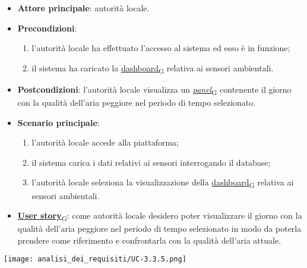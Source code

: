 \begin{itemize}
	\item \textbf{Attore principale}: autorità locale.
	\item \textbf{Precondizioni}:
	      \begin{enumerate}
		      \item l'autorità locale ha effettuato l'accesso al sistema ed esso è in funzione;
		      \item il sistema ha caricato la \href{https://7last.github.io/docs/pb/documentazione-interna/glossario\#dashboard}{dashboard\textsubscript{G}} relativa ai sensori ambientali.
	      \end{enumerate}
	\item \textbf{Postcondizioni}: l'autorità locale visualizza un \href{https://7last.github.io/docs/pb/documentazione-interna/glossario\#panel}{\textit{panel}\textsubscript{G}} contenente il giorno con la qualità dell'aria peggiore nel periodo di tempo selezionato.
	\item \textbf{Scenario principale}:
	      \begin{enumerate}
		      \item l'autorità locale accede alla piattaforma;
		      \item il sistema carica i dati relativi ai sensori interrogando il database;
		      \item l'autorità locale seleziona la visualizzazione della \href{https://7last.github.io/docs/pb/documentazione-interna/glossario\#dashboard}{dashboard\textsubscript{G}} relativa ai sensori ambientali.
	      \end{enumerate}
	\item \href{https://7last.github.io/docs/pb/documentazione-interna/glossario\#user-story}{\textbf{User story}\textsubscript{G}}:
	      come autorità locale desidero poter visualizzare il giorno con la qualità dell'aria peggiore nel periodo di tempo selezionato
	      in modo da poterla prendere come riferimento e confrontarla con la qualità dell'aria attuale.
\end{itemize}
\begin{center}
	\texttt{[image: analisi\_dei\_requisiti/UC-3.3.5.png]}
\end{center}


